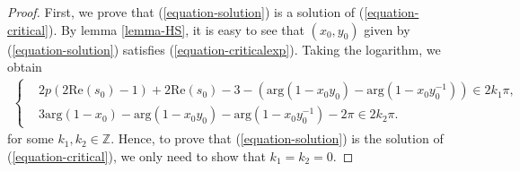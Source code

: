 \documentclass[12pt]{amsart}
\begin{document}
\begin{proof}
First, we prove that (\ref{equation-solution}) is a solution of  (\ref{equation-critical}). 
By lemma \ref{lemma-HS}, it is easy to see that $(x_0,y_0)$ given by (\ref{equation-solution}) satisfies (\ref{equation-criticalexp}). Taking the logarithm, we obtain  
\begin{align}
\left\{\begin{aligned} \label{equation-criticalargument}   
   & 2p(2\text{Re}(s_0)-1)+2\text{Re}(s_0)-3-\left(\text{arg}(1-x_0y_0)-\text{arg}(1-x_0y_0^{-1})\right)\in 2k_1\pi, \\
   &3\text{arg}(1-x_0)-\text{arg}(1-x_0y_0)-\text{arg}(1-x_0y_0^{-1})-2\pi\in 2k_2\pi.
    \end{aligned}\right.
\end{align}
for some $k_1,k_2\in \mathbb{Z}$. Hence, to prove that (\ref{equation-solution}) is the solution of (\ref{equation-critical}), we only need to show that $k_1=k_2=0$. 





\end{proof}
\end{document}
